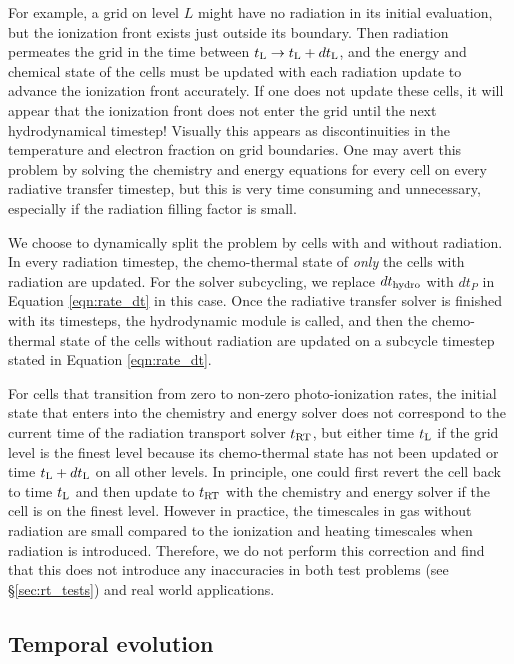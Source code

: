 \documentclass[useAMS,usenatbib]{mn2e}
\begin{document}
For example, a grid on level $L$ might have no radiation in its
initial evaluation, but the ionization front exists just outside its
boundary.  Then radiation permeates the grid in the time between
$t_{\rm L} \rightarrow t_{\rm L}+dt_{\rm L}$, and the energy and
chemical state of the cells must be updated with each radiation update
to advance the ionization front accurately.  If one does not update
these cells, it will appear that the ionization front does not enter
the grid until the next hydrodynamical timestep!  Visually this
appears as discontinuities in the temperature and electron fraction on
grid boundaries.  One may avert this problem by solving the chemistry
and energy equations for every cell on every radiative transfer
timestep, but this is very time consuming and unnecessary, especially
if the radiation filling factor is small.

We choose to dynamically split the problem by cells with and without
radiation.  In every radiation timestep, the chemo-thermal state of
\textit{only} the cells with radiation are updated.  For the solver
subcycling, we replace $dt_{\rm hydro}$ with $dt_P$ in Equation
\ref{eqn:rate_dt} in this case.  Once the radiative transfer solver is
finished with its timesteps, the hydrodynamic module is called, and
then the chemo-thermal state of the cells without radiation are
updated on a subcycle timestep stated in Equation \ref{eqn:rate_dt}.

For cells that transition from zero to non-zero photo-ionization
rates, the initial state that enters into the chemistry and energy
solver does not correspond to the current time of the radiation
transport solver $t_{\rm RT}$, but either time $t_{\rm L}$ if the grid
level is the finest level because its chemo-thermal state has not been
updated or time $t_{\rm L}+dt_{\rm L}$ on all other levels.  In
principle, one could first revert the cell back to time $t_{\rm L}$
and then update to $t_{\rm RT}$ with the chemistry and energy solver
if the cell is on the finest level.  However in practice, the
timescales in gas without radiation are small compared to the
ionization and heating timescales when radiation is introduced.
Therefore, we do not perform this correction and find that this does
not introduce any inaccuracies in both test problems (see
\S\ref{sec:rt_tests}) and real world applications.


\subsection{Temporal evolution}
\label{sec:timestepping}
\end{document}
